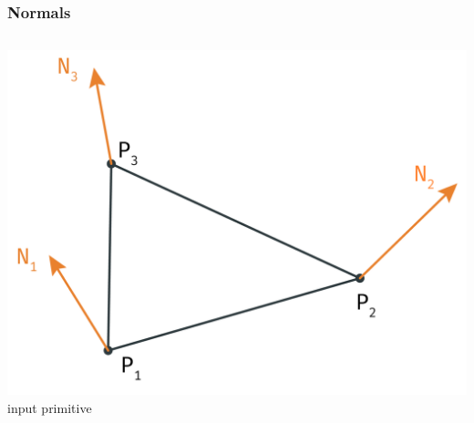 	\begin{frame}\frametitle{Normals}
		\begin{columns}
			\begin{column}{0.6\textwidth}
				\begin{center}
					\includegraphics[width=\textwidth]{img/1_single/inputPrimitive_emphNormal.png}
					\small{input primitive}
				\end{center}
			\end{column}
		\end{columns}
	\end{frame}



